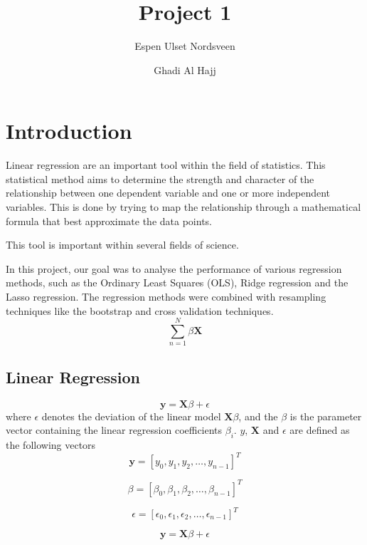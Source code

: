 \documentclass{article}
\title{Project 1}
\author{Espen Ulset Nordsveen
\and Ghadi Al Hajj}
\begin{document}
\maketitle
\section{Introduction}
Linear regression are an important tool within the field of statistics. This statistical method aims to determine the strength and character of the relationship between one dependent variable and one or more independent variables. This is done by trying to map the relationship through a mathematical formula that best approximate the data points.

This tool is important within several fields of science.

In this project, our goal was to analyse the performance of various regression methods, such as the Ordinary Least Squares (OLS), Ridge regression and the Lasso regression. The regression methods were combined with resampling techniques like the bootstrap and cross validation techniques. 
$$\sum_{n=1}^{N} \beta\textbf{X} $$
\subsection{Linear Regression}
\begin{equation}
\textbf{y} = \textbf{X}\beta + \epsilon
\end{equation}
where $\epsilon$ denotes the deviation of the linear model $\textbf{X}\beta$, and the $\beta$ is the parameter vector containing the linear regression coefficients $\beta_{i}$. $y$, $\textbf{X}$ and $\epsilon$ are defined as the following vectors
\begin{equation}
\textbf{y} = [y_{0}, y_{1}, y_{2}, \dots, y_{n-1}]^{T}
\end{equation}

\begin{equation}
\beta = [\beta_{0}, \beta_{1}, \beta_{2}, \dots, \beta_{n-1}]^{T}
\end{equation}

\begin{equation}
\epsilon = [\epsilon_{0}, \epsilon_{1}, \epsilon_{2}, \dots, \epsilon_{n-1}]^{T}
\end{equation}

\begin{equation}
\textbf{\~{y}} = \textbf{X}\beta + \epsilon
\end{equation}
\end{document}

